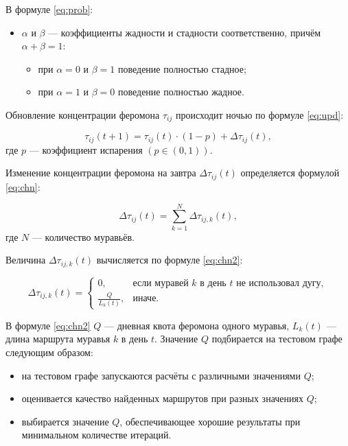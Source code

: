 В формуле \eqref{eq:prob}:
\begin{itemize}
  \item $\alpha$ и $\beta$ --- коэффициенты жадности и стадности соответственно, причём $\alpha + \beta = 1$:
  \begin{itemize}
      \item при $\alpha = 0$ и $\beta = 1$ поведение полностью стадное;
      \item при $\alpha = 1$ и $\beta = 0$ поведение полностью жадное.
  \end{itemize}
\end{itemize}

Обновление концентрации феромона $\tau_{ij}$ происходит ночью по формуле \eqref{eq:upd}:

\begin{equation}
\label{eq:upd}
\tau_{ij}(t+1) = \tau_{ij}(t) \cdot (1-p) + \Delta\tau_{ij}(t),
\end{equation}
где $p$ --- коэффициент испарения $(p \in (0, 1))$. 

Изменение концентрации феромона на завтра $\Delta\tau_{ij}(t)$ определяется формулой \eqref{eq:chn}:

\begin{equation}
\label{eq:chn}
\Delta\tau_{ij}(t) = \sum_{k=1}^{N} \Delta\tau_{ij, k}(t),
\end{equation}
где $N$ --- количество муравьёв. 

Величина $\Delta\tau_{ij, k}(t)$ вычисляется по формуле \eqref{eq:chn2}:

\begin{equation}
  \label{eq:chn2}
  \Delta\tau_{ij, k}(t) = 
  \begin{cases} 
    0, & \text{если муравей $k$ в день $t$ не использовал дугу}, \\ 
    \frac{Q}{L_k(t)}, & \text{иначе}.
  \end{cases}
\end{equation}

В формуле \eqref{eq:chn2} $Q$ --- дневная квота феромона одного муравья, $L_k(t)$ --- длина маршрута муравья $k$ в день $t$. Значение $Q$ подбирается на тестовом графе следующим образом:

\begin{itemize}
  \item на тестовом графе запускаются расчёты с различными значениями $Q$;
  \item оценивается качество найденных маршрутов при разных значениях $Q$;
  \item выбирается значение $Q$, обеспечивающее хорошие результаты при минимальном количестве итераций.
\end{itemize}

